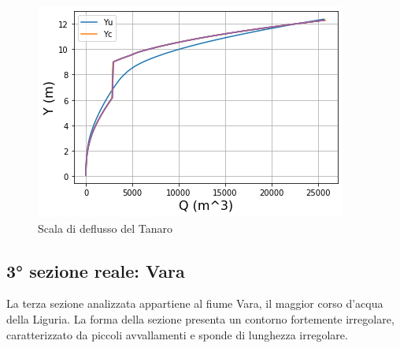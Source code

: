 \documentclass[12pt]{article} %
\begin{document}
\begin{figure}[H]
    \centering
    \includegraphics[scale=0.8]{deflussota.png}
    \caption{Scala di deflusso del Tanaro}
    \label{fig:Tanaro_scala_deflusso}
\end{figure}


\subsection{3° sezione reale: Vara}

\noindent La terza sezione analizzata appartiene al fiume Vara, il maggior corso d’acqua della Liguria.
La forma della sezione presenta un contorno fortemente irregolare, caratterizzato da piccoli avvallamenti e sponde di lunghezza irregolare.
\end{document}
